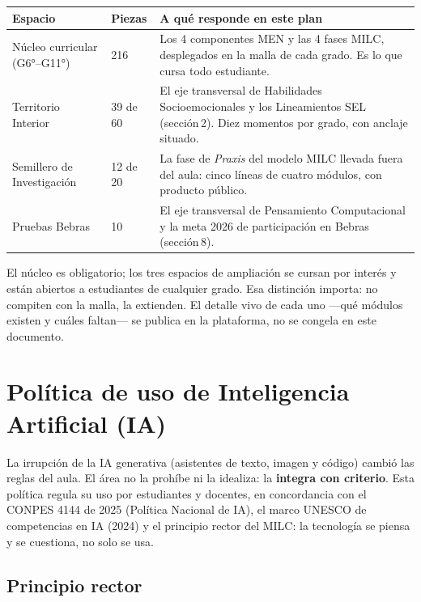 \documentclass[12pt, a4paper]{article}
\begin{document}
\begin{center}
\begin{tabular}{|L{3.4cm}|L{2.6cm}|L{7.5cm}|}
\hline
{}
\color{white}\textbf{Espacio} &
\color{white}\textbf{Piezas} &
\color{white}\textbf{A qué responde en este plan} \\
\hline
Núcleo curricular (G6°–G11°) &
216 &
Los 4 componentes MEN y las 4 fases MILC, desplegados en la malla de cada grado.
Es lo que cursa todo estudiante. \\
\hline
Territorio Interior &
39 de 60 &
El eje transversal de Habilidades Socioemocionales y los Lineamientos SEL
(sección\,2). Diez momentos por grado, con anclaje situado. \\
\hline
Semillero de Investigación &
12 de 20 &
La fase de \emph{Praxis} del modelo MILC llevada fuera del aula: cinco líneas de
cuatro módulos, con producto público. \\
\hline
Pruebas Bebras &
10 &
El eje transversal de Pensamiento Computacional y la meta 2026 de participación
en Bebras (sección\,8). \\
\hline
\end{tabular}
\end{center}

\noindent El núcleo es obligatorio; los tres espacios de ampliación se cursan por
interés y están abiertos a estudiantes de cualquier grado. Esa distinción importa:
no compiten con la malla, la extienden. El detalle vivo de cada uno —qué módulos
existen y cuáles faltan— se publica en la plataforma, no se congela en este
documento.

\section{Política de uso de Inteligencia Artificial (IA)}

La irrupción de la IA generativa (asistentes de texto, imagen y código) cambió
las reglas del aula. El área no la prohíbe ni la idealiza: la \textbf{integra con
criterio}. Esta política regula su uso por estudiantes y docentes, en
concordancia con el CONPES 4144 de 2025 (Política Nacional de IA), el marco
UNESCO de competencias en IA (2024) y el principio rector del MILC: la tecnología
se piensa y se cuestiona, no solo se usa.

\subsection{Principio rector}
\end{document}
